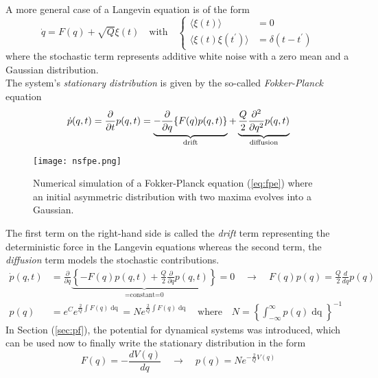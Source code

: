 A more general case of a Langevin equation is of the form
\begin{equation}
	\dot{q}=F(q)+\sqrt{Q}\xi(t)\quad\text{with}\quad
	\begin{cases}
		\langle \xi(t)\rangle&=0\\
		\langle \xi(t)\xi(t^\prime)\rangle&=\delta(t-t^\prime)
	\end{cases}
\end{equation}
where the stochastic term represents additive white noise with a zero mean and a Gaussian distribution.\\
The system’s \emph{stationary distribution} is given by the so-called \emph{Fokker-Planck} equation
\begin{equation}{\label{eq:fpe}}
	\dot{p}(q,t)=\frac{\partial}{\partial t}p(q,t)=\underbrace{-\frac{\partial}{\partial q}\{F(q)p(q,t)\}}_{\text{drift}}+\underbrace{\frac{Q}{2}\frac{\partial^2}{\partial q^2}p(q,t)}_{\text{diffusion}}
\end{equation}
\begin{wrapfigure}{r}{0.33\linewidth}
	\centering
	\texttt{[image: nsfpe.png]}
	\caption{Numerical simulation of a Fokker-Planck equation (\ref{eq:fpe}) where an initial asymmetric distribution with two maxima evolves into a Gaussian.}
	\label{fig:nsfpe}
\end{wrapfigure}
The first term on the right-hand side is called the \emph{drift} term representing the deterministic force in the Langevin equations whereas the second term, the \emph{diffusion} term models the stochastic contributions.
\begin{equation*}
	\begin{aligned}
		\dot{p}(q,t)&=\frac{\partial}{\partial q}\underbrace{\left\{-F(q)p(q,t)+\frac{Q}{2}\frac{\partial}{\partial q}p(q,t)\right\}}_{=\text{constant=0}}=0\quad\rightarrow\quad F(q)p(q)=\frac{Q}{2}\frac{d}{dq}p(q)\\
		p(q)&=e^C e^{\frac{2}{Q}\int F(q)\mathop{dq}}=Ne^{\frac{2}{Q}\int F(q)\mathop{dq}}\quad\text{where}\quad N=\left\{\int_{-\infty}^\infty p(q)\mathop{dq}\right\}^{-1}
	\end{aligned}
\end{equation*}
In Section (\ref{sec:pf}), the potential for dynamical systems was introduced, which can be used now to finally write the stationary distribution in the form
\begin{equation}
	F(q)=-\frac{dV(q)}{dq}\quad\rightarrow\quad p(q)=Ne^{-\frac{2}{Q}V(q)}
\end{equation}
